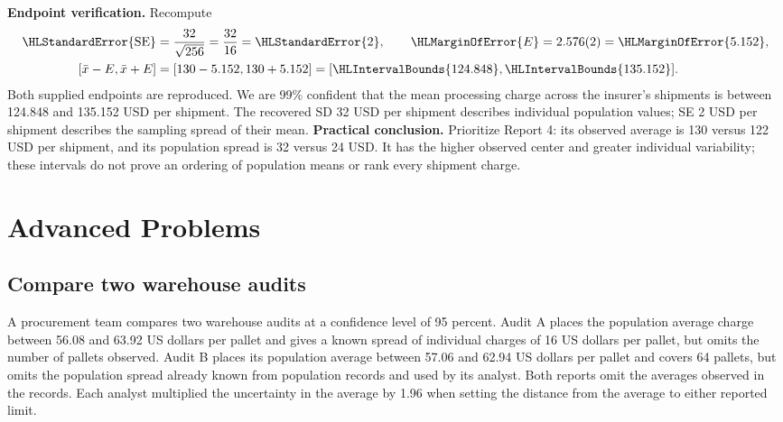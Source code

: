 \textbf{Endpoint verification.} Recompute
\[\begin{aligned}
\HLStandardError{\mathrm{SE}}&=\frac{32}{\sqrt{256}}=\frac{32}{16}=\HLStandardError{2},\qquad \HLMarginOfError{E}=2.576(2)=\HLMarginOfError{5.152},\\
[\bar x-E,\bar x+E]&=[130-5.152,130+5.152]=[\HLIntervalBounds{124.848},\HLIntervalBounds{135.152}].
\end{aligned}\]
Both supplied endpoints are reproduced. We are 99\% confident that the mean processing charge across the insurer's shipments is between 124.848 and 135.152 USD per shipment.
The recovered SD 32 USD per shipment describes individual population values; SE 2 USD per shipment describes the sampling spread of their mean.
\textbf{Practical conclusion.} Prioritize Report 4: its observed average is 130 versus 122 USD per shipment, and its population spread is 32 versus 24 USD. It has the higher observed center and greater individual variability; these intervals do not prove an ordering of population means or rank every shipment charge.
\endgroup
{}

\clearpage
{}
\section{Advanced Problems}\label{sec:advanced}
\subsection{Compare two warehouse audits}\label{prob:c4-advanced-1}
A procurement team compares two warehouse audits at a confidence level of 95 percent. Audit A places the population average charge between 56.08 and 63.92 US dollars per pallet and gives a known spread of individual charges of 16 US dollars per pallet, but omits the number of pallets observed. Audit B places its population average between 57.06 and 62.94 US dollars per pallet and covers 64 pallets, but omits the population spread already known from population records and used by its analyst. Both reports omit the averages observed in the records. Each analyst multiplied the uncertainty in the average by 1.96 when setting the distance from the average to either reported limit.

